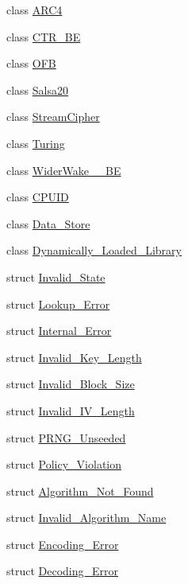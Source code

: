 \begin{DoxyCompactItemize}
class \hyperlink{classBotan_1_1ARC4}{A\-R\-C4}
\item 
class \hyperlink{classBotan_1_1CTR__BE}{C\-T\-R\-\_\-\-B\-E}
\item 
class \hyperlink{classBotan_1_1OFB}{O\-F\-B}
\item 
class \hyperlink{classBotan_1_1Salsa20}{Salsa20}
\item 
class \hyperlink{classBotan_1_1StreamCipher}{Stream\-Cipher}
\item 
class \hyperlink{classBotan_1_1Turing}{Turing}
\item 
class \hyperlink{classBotan_1_1WiderWake__41__BE}{Wider\-Wake\-\_\-\_\-\-B\-E}
\item 
class \hyperlink{classBotan_1_1CPUID}{C\-P\-U\-I\-D}
\item 
class \hyperlink{classBotan_1_1Data__Store}{Data\-\_\-\-Store}
\item 
class \hyperlink{classBotan_1_1Dynamically__Loaded__Library}{Dynamically\-\_\-\-Loaded\-\_\-\-Library}
\item 
struct \hyperlink{structBotan_1_1Invalid__State}{Invalid\-\_\-\-State}
\item 
struct \hyperlink{structBotan_1_1Lookup__Error}{Lookup\-\_\-\-Error}
\item 
struct \hyperlink{structBotan_1_1Internal__Error}{Internal\-\_\-\-Error}
\item 
struct \hyperlink{structBotan_1_1Invalid__Key__Length}{Invalid\-\_\-\-Key\-\_\-\-Length}
\item 
struct \hyperlink{structBotan_1_1Invalid__Block__Size}{Invalid\-\_\-\-Block\-\_\-\-Size}
\item 
struct \hyperlink{structBotan_1_1Invalid__IV__Length}{Invalid\-\_\-\-I\-V\-\_\-\-Length}
\item 
struct \hyperlink{structBotan_1_1PRNG__Unseeded}{P\-R\-N\-G\-\_\-\-Unseeded}
\item 
struct \hyperlink{structBotan_1_1Policy__Violation}{Policy\-\_\-\-Violation}
\item 
struct \hyperlink{structBotan_1_1Algorithm__Not__Found}{Algorithm\-\_\-\-Not\-\_\-\-Found}
\item 
struct \hyperlink{structBotan_1_1Invalid__Algorithm__Name}{Invalid\-\_\-\-Algorithm\-\_\-\-Name}
\item 
struct \hyperlink{structBotan_1_1Encoding__Error}{Encoding\-\_\-\-Error}
\item 
struct \hyperlink{structBotan_1_1Decoding__Error}{Decoding\-\_\-\-Error}
\item 

\end{DoxyCompactItemize}
